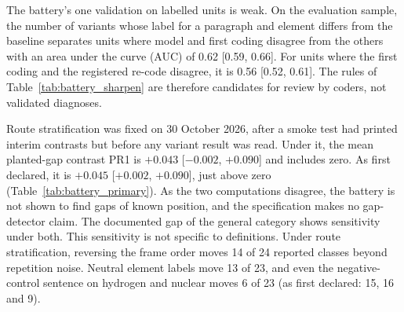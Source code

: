 The battery's one validation on labelled units is weak. On the evaluation sample, the number of variants whose label for a paragraph and element differs from the baseline separates units where model and first coding disagree from the others with an area under the curve (AUC) of 0.62 [0.59, 0.66]. For units where the first coding and the registered re-code disagree, it is 0.56 [0.52, 0.61]. The rules of Table~\ref{tab:battery_sharpen} are therefore candidates for review by coders, not validated diagnoses.

Route stratification was fixed on 30 October 2026, after a smoke test had printed interim contrasts but before any variant result was read. Under it, the mean planted-gap contrast PR1 is $+0.043$ [$-0.002$, $+0.090$] and includes zero. As first declared, it is $+0.045$ [$+0.002$, $+0.090$], just above zero (Table~\ref{tab:battery_primary}). As the two computations disagree, the battery is not shown to find gaps of known position, and the specification makes no gap-detector claim. The documented gap of the general category shows sensitivity under both. This sensitivity is not specific to definitions. Under route stratification, reversing the frame order moves 14 of 24 reported classes beyond repetition noise. Neutral element labels move 13 of 23, and even the negative-control sentence on hydrogen and nuclear moves 6 of 23 (as first declared: 15, 16 and 9).

